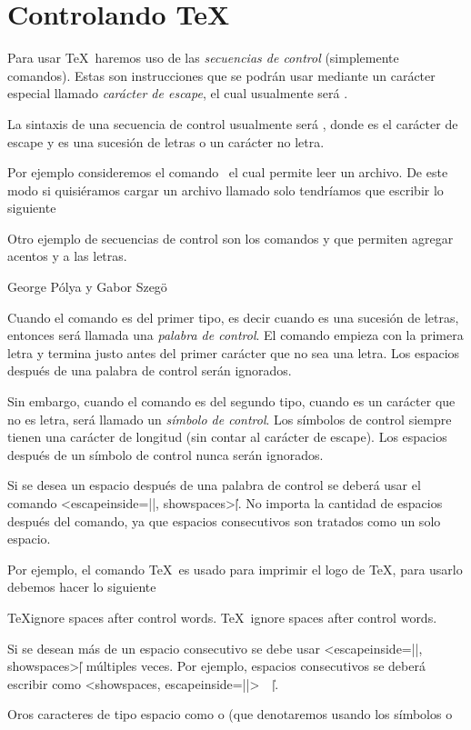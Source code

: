 \section{Controlando \TeX}

Para usar \TeX\ haremos uso de las \emph{secuencias de control} (simplemente comandos). Estas son instrucciones que se podrán usar mediante un carácter especial llamado \emph{carácter de escape}, el cual usualmente será \codeline{\ }.

La sintaxis de una secuencia de control usualmente será , donde  es el carácter de escape y  es una sucesión de letras o un carácter no letra.

Por ejemplo consideremos el comando \texcs\ el cual permite leer un archivo. De este modo si quisiéramos cargar un archivo llamado  solo tendríamos que escribir lo siguiente
\begin{texcode}
  
\end{texcode}

Otro ejemplo de secuencias de control son los comandos \codeline{\'} y \codeline{\"} que permiten agregar acentos y a las letras.
\begin{texexample}
  George P\'olya y Gabor Szeg\"o
\end{texexample}

Cuando el comando es del primer tipo, es decir cuando  es una sucesión de letras, entonces será llamada una \emph{palabra de control}. El comando empieza con la primera letra y termina justo antes del primer carácter que no sea una letra. Los espacios después de una palabra de control serán ignorados.

Sin embargo, cuando el comando es del segundo tipo, cuando  es un carácter que no es letra, será llamado un \emph{símbolo de control}. Los símbolos de control siempre tienen una carácter de longitud (sin contar al carácter de escape). Los espacios después de un símbolo de control nunca serán ignorados.

Si se desea un espacio después de una palabra de control se deberá usar el comando \texline<escapeinside=||, showspaces>{\| |}. No importa la cantidad de espacios después del comando, ya que espacios consecutivos son tratados como un solo espacio.

Por ejemplo, el comando \texcs\TeX\ es usado para imprimir el logo de \TeX, para usarlo debemos hacer lo siguiente
\begin{texexample}
  \TeX ignore spaces after control words.
  \TeX\ ignore spaces after control words.
\end{texexample}

Si se desean más de un espacio consecutivo se debe usar \texline<escapeinside=||, showspaces>{\| |} múltiples veces. Por ejemplo, espacios consecutivos se deberá escribir como \texline<showspaces, escapeinside=||>{\ \ \| |}.

Oros caracteres de tipo espacio como  o  (que denotaremos usando los símbolos  o 
